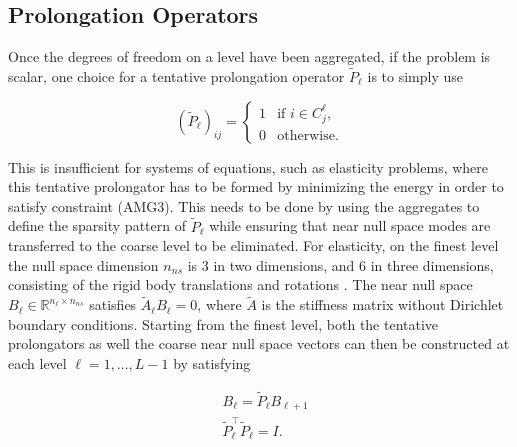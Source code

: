 \subsection{Prolongation Operators}

Once the degrees of freedom on a level have been aggregated, if the problem is scalar, one choice for a tentative prolongation operator $\tilde{P}_\ell$ is to simply use

\begin{equation}
	\left(\tilde P_\ell \right)_{ij} =
	\begin{cases}
		1 & \text{if $i \in C_j^\ell$}, \\
		0 & \text{otherwise}.
	\end{cases}
\end{equation}

This is insufficient for systems of equations, such as elasticity problems, where this tentative prolongator has to be formed by minimizing the energy in order to satisfy constraint (AMG3). This needs to be done by using the aggregates to define the sparsity pattern of $\tilde{P}_\ell$ while ensuring that near null space modes are transferred to the coarse level to be eliminated. For elasticity, on the finest level the null space dimension $n_{ns}$ is 3 in two dimensions, and 6 in three dimensions, consisting of the rigid body translations and rotations \cite{Gee2009}. The near null space $B_\ell \in \mathbb{R}^{n_\ell \times n_{ns}}$ satisfies $\tilde{A}_\ell B_\ell = 0$, where $\tilde{A}$ is the stiffness matrix without Dirichlet boundary conditions. Starting from the finest level, both the tentative prolongators as well the coarse near null space vectors can then be constructed at each level $\ell = 1, \ldots, L - 1$ by satisfying

\begin{equation}
	\label{eq:prolongator_req}
	\begin{aligned}
	& B_\ell = \tilde{P}_\ell B_{\ell+1} \\
	& \tilde{P}_\ell^\top \tilde{P}_\ell = I.
	\end{aligned}
\end{equation}


